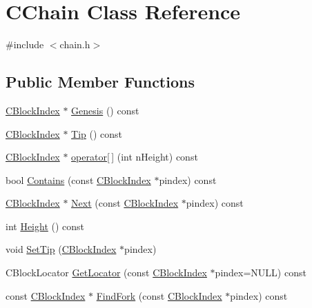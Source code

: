 \hypertarget{class_c_chain}{}\section{C\+Chain Class Reference}
\label{class_c_chain}


{\ttfamily \#include $<$chain.\+h$>$}

\subsection*{Public Member Functions}
\begin{DoxyCompactItemize}
\item 
\mbox{\hyperlink{class_c_block_index}{C\+Block\+Index}} $\ast$ \mbox{\hyperlink{class_c_chain_a0af94042e68f7dbc86260d3a54f08a3f}{Genesis}} () const
\item 
\mbox{\hyperlink{class_c_block_index}{C\+Block\+Index}} $\ast$ \mbox{\hyperlink{class_c_chain_a578545bde95163bee37b1be28e7b2755}{Tip}} () const
\item 
\mbox{\hyperlink{class_c_block_index}{C\+Block\+Index}} $\ast$ \mbox{\hyperlink{class_c_chain_a13c4493c833ffb8d1725fde05e42b28a}{operator\mbox{[}$\,$\mbox{]}}} (int n\+Height) const
\item 
bool \mbox{\hyperlink{class_c_chain_af1786dc229c215dea7f727c11df2c8dc}{Contains}} (const \mbox{\hyperlink{class_c_block_index}{C\+Block\+Index}} $\ast$pindex) const
\item 
\mbox{\hyperlink{class_c_block_index}{C\+Block\+Index}} $\ast$ \mbox{\hyperlink{class_c_chain_a3077e83c87e8a974765fa76a57fd040b}{Next}} (const \mbox{\hyperlink{class_c_block_index}{C\+Block\+Index}} $\ast$pindex) const
\item 
int \mbox{\hyperlink{class_c_chain_ad4758bc8872ce065a9579f77c3171d40}{Height}} () const
\item 
void \mbox{\hyperlink{class_c_chain_aeb563751f7362d4308c7c2cb35b834a5}{Set\+Tip}} (\mbox{\hyperlink{class_c_block_index}{C\+Block\+Index}} $\ast$pindex)
\item 
C\+Block\+Locator \mbox{\hyperlink{class_c_chain_a03e98bebe804bfba219b4e6a2b858d9f}{Get\+Locator}} (const \mbox{\hyperlink{class_c_block_index}{C\+Block\+Index}} $\ast$pindex=N\+U\+LL) const
\item 
const \mbox{\hyperlink{class_c_block_index}{C\+Block\+Index}} $\ast$ \mbox{\hyperlink{class_c_chain_adb9ec01329511e869bba95e3c143da71}{Find\+Fork}} (const \mbox{\hyperlink{class_c_block_index}{C\+Block\+Index}} $\ast$pindex) const
\end{DoxyCompactItemize}
